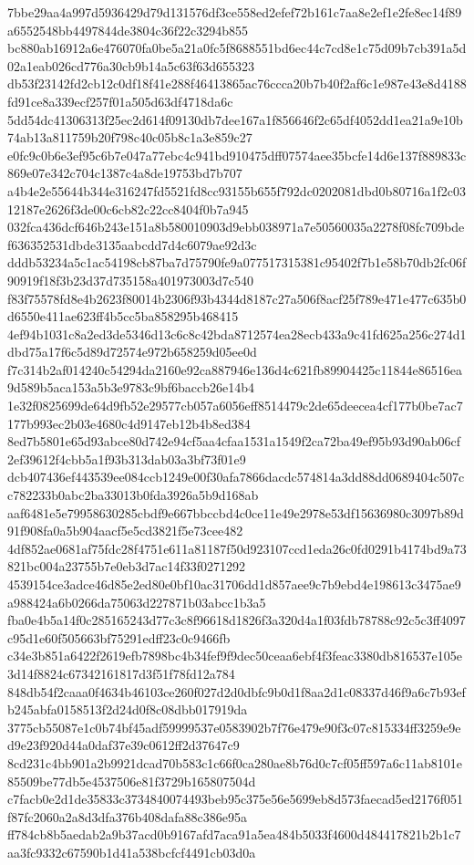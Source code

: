 \documentclass[11pt,a4paper]{article}
\begin{document}
{7bbe29aa4a997d5936429d79d131576df3ce558ed2efef72b161c7aa8e2ef1e2fe8ec14f89a6552548bb4497844de3804c36f22c3294b855
bc880ab16912a6e476070fa0be5a21a0fc5f8688551bd6ec44c7cd8e1c75d09b7cb391a5d02a1eab026cd776a30cb9b14a5c63f63d655323
db53f23142fd2cb12c0df18f41e288f46413865ac76ccca20b7b40f2af6c1e987e43e8d4188fd91ce8a339ecf257f01a505d63df4718da6c
5dd54dc41306313f25ec2d614f09130db7dee167a1f856646f2c65df4052dd1ea21a9e10b74ab13a811759b20f798c40c05b8c1a3e859c27
e0fc9c0b6e3ef95c6b7e047a77ebc4c941bd910475dff07574aee35bcfe14d6e137f889833c869e07e342c704c1387c4a8de19753bd7b707
a4b4e2e55644b344e316247fd5521fd8cc93155b655f792dc0202081dbd0b80716a1f2c0312187e2626f3de00c6cb82c22cc8404f0b7a945
032fca436dcf646b243e151a8b580010903d9ebb038971a7e50560035a2278f08fc709bdef636352531dbde3135aabcdd7d4c6079ae92d3c
dddb53234a5c1ac54198cb87ba7d75790fe9a077517315381c95402f7b1e58b70db2fc06f90919f18f3b23d37d735158a401973003d7c540
f83f75578fd8e4b2623f80014b2306f93b4344d8187c27a506f8acf25f789e471e477c635b0d6550e411ae623ff4b5cc5ba858295b468415
4ef94b1031c8a2ed3de5346d13c6c8c42bda8712574ea28ecb433a9c41fd625a256c274d1dbd75a17f6c5d89d72574e972b658259d05ee0d
f7c314b2af014240c54294da2160e92ca887946e136d4c621fb89904425c11844e86516ea9d589b5aca153a5b3e9783c9bf6baccb26e14b4
1e32f0825699de64d9fb52e29577cb057a6056eff8514479c2de65deecea4cf177b0be7ac7177b993ec2b03e4680c4d9147eb12b4b8ed384
8ed7b5801e65d93abce80d742e94cf5aa4cfaa1531a1549f2ca72ba49ef95b93d90ab06cf2ef39612f4cbb5a1f93b313dab03a3bf73f01e9
dcb407436ef443539ee084ccb1249e00f30afa7866dacdc574814a3dd88dd0689404c507cc782233b0abc2ba33013b0fda3926a5b9d168ab
aaf6481e5e79958630285cbdf9e667bbccbd4c0ce11e49e2978e53df15636980c3097b89d91f908fa0a5b904aacf5e5cd3821f5e73cee482
4df852ae0681af75fdc28f4751e611a81187f50d923107ccd1eda26c0fd0291b4174bd9a73821bc004a23755b7e0eb3d7ac14f33f0271292
4539154ce3adce46d85e2ed80e0bf10ac31706dd1d857aee9c7b9ebd4e198613c3475ae9a988424a6b0266da75063d227871b03abcc1b3a5
fba0e4b5a14f0c285165243d77c3c8f96618d1826f3a320d4a1f03fdb78788c92c5c3ff4097c95d1e60f505663bf75291edff23c0c9466fb
c34e3b851a6422f2619efb7898bc4b34fef9f9dec50ceaa6ebf4f3feac3380db816537e105e3d14f8824c67342161817d3f51f78fd12a784
848db54f2caaa0f4634b46103ce260f027d2d0dbfc9b0d1f8aa2d1c08337d46f9a6c7b93efb245abfa0158513f2d24d0f8c08dbb017919da
3775cb55087e1c0b74bf45adf59999537e0583902b7f76e479e90f3c07c815334ff3259e9ed9e23f920d44a0daf37e39c0612ff2d37647c9
8cd231c4bb901a2b9921dcad70b583c1c66f0ca280ae8b76d0c7cf05ff597a6c11ab8101e85509be77db5e4537506e81f3729b165807504d
c7facb0e2d1de35833c3734840074493beb95c375e56e5699eb8d573faecad5ed2176f051f87fc2060a2a8d3dfa376b408dafa88c386e95a
ff784cb8b5aedab2a9b37acd0b9167afd7aca91a5ea484b5033f4600d484417821b2b1c7aa3fc9332c67590b1d41a538bcfcf4491cb03d0a
}
\end{document}
